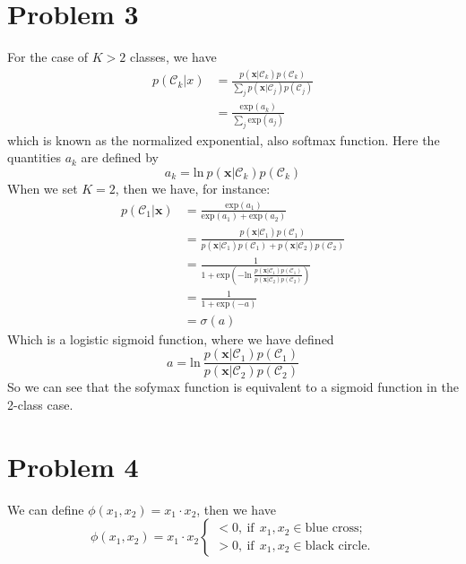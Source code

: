 \documentclass{article}
\begin{document}
\section*{Problem 3}
For the case of $K>2$ classes, we have
\begin{equation}
\begin{aligned}
p(\mathcal{C}_k|x)
&= \frac{p(\bm{x}|\mathcal{C}_k)p(\mathcal{C}_k)}{\sum_{j}p(\bm{x}|\mathcal{C}_j)p(\mathcal{C}_j)}\\
&= \frac{\mathrm{exp}(a_k)}{\sum_{j}\mathrm{exp}(a_j)}
\end{aligned}
\end{equation}
which is known as the normalized exponential, also softmax function. Here the quantities $a_k$ are defined by
\begin{equation}
a_k = \mathrm{ln}\ p(\bm{x}|\mathcal{C}_k)p(\mathcal{C}_k)
\end{equation}
When we set $K=2$, then we have, for instance:
\begin{equation}
\begin{aligned}
p(\mathcal{C}_1|\bm{x})
&= \frac{\mathrm{exp}(a_1)}{\mathrm{exp}(a_1)+\mathrm{exp}(a_2)}\\
&= \frac{p(\bm{x}|\mathcal{C}_1)p(\mathcal{C}_1)}{p(\bm{x}|\mathcal{C}_1)p(\mathcal{C}_1)+p(\bm{x}|\mathcal{C}_2)p(\mathcal{C}_2)}\\
&= \frac{1}{1+\mathrm{exp}(-\mathrm{ln}\ \frac{p(\bm{x}|\mathcal{C}_1)p(\mathcal{C}_1)}{p(\bm{x}|\mathcal{C}_2)p(\mathcal{C}_2)})}\\
&= \frac{1}{1+\mathrm{exp}(-a)}\\
&= \sigma(a)
\end{aligned}
\end{equation}
Which is a logistic sigmoid function, where we have defined
\begin{equation}
a=\mathrm{ln}\ \frac{p(\bm{x}|\mathcal{C}_1)p(\mathcal{C}_1)}{p(\bm{x}|\mathcal{C}_2)p(\mathcal{C}_2)}
\end{equation}
So we can see that the sofymax function is equivalent to a sigmoid function in the 2-class case.


\section*{Problem 4}
We can define $\phi(x_1, x_2) = x_1\cdot x_2$, then we have
\begin{equation}
\phi(x_1, x_2)=x_1\cdot x_2\begin{cases}
<0,\ \text{if}\ \ x_1, x_2 \in \text{blue cross};\\
>0,\ \text{if}\ \ x_1, x_2 \in \text{black circle}.
\end{cases}
\end{equation}
\small


\end{document}
